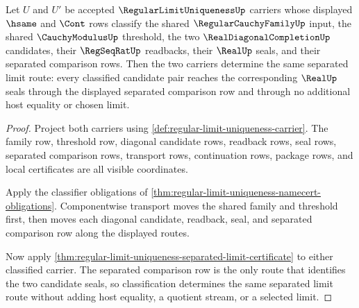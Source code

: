 \begin{theorem}
\label{thm:regular-limit-uniqueness-classifier-determinacy}
Let $U$ and $U'$ be accepted $\RegularLimitUniquenessUp$ carriers whose displayed $\hsame$ and $\Cont$ rows classify the shared $\RegularCauchyFamilyUp$ input, the shared $\CauchyModulusUp$ threshold, the two $\RealDiagonalCompletionUp$ candidates, their $\RegSeqRatUp$ readbacks, their $\RealUp$ seals, and their separated comparison rows. Then the two carriers determine the same separated limit route: every classified candidate pair reaches the corresponding $\RealUp$ seals through the displayed separated comparison row and through no additional host equality or chosen limit.
\end{theorem}
\begin{proof}
Project both carriers using \autoref{def:regular-limit-uniqueness-carrier}. The family row, threshold row, diagonal candidate rows, readback rows, seal rows, separated comparison rows, transport rows, continuation rows, package rows, and local certificates are all visible coordinates.

Apply the classifier obligations of \autoref{thm:regular-limit-uniqueness-namecert-obligations}. Componentwise transport moves the shared family and threshold first, then moves each diagonal candidate, readback, seal, and separated comparison row along the displayed routes.

Now apply \autoref{thm:regular-limit-uniqueness-separated-limit-certificate} to either classified carrier. The separated comparison row is the only route that identifies the two candidate seals, so classification determines the same separated limit route without adding host equality, a quotient stream, or a selected limit.
\end{proof}

